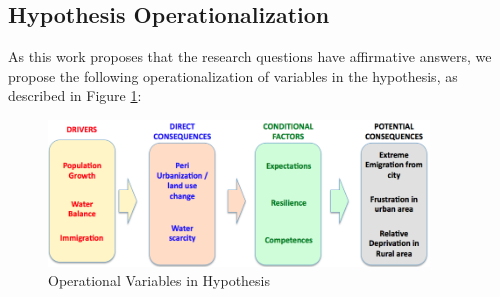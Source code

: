 \documentclass[doc,12pt,floatsintext]{apa7}
\begin{document}
\subsection{Hypothesis Operationalization}

As this work proposes that the research questions have affirmative answers, we propose the following operationalization of variables in the hypothesis, as described in Figure \ref{operational}:

\begin{figure}[h]
  \centering
  \includegraphics[width=0.9\textwidth]{operational}
  \caption[Operational Variables in Hypothesis]{Operational Variables in Hypothesis}
  \label{operational}
\end{figure}
\end{document}
